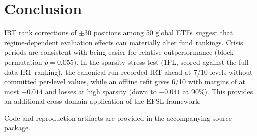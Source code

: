 \documentclass[11pt,a4paper]{article}
\begin{document}
\section{Conclusion}

IRT rank corrections of $\pm$30 positions among 50 global ETFs suggest that regime-dependent evaluation effects can materially alter fund rankings. Crisis periods are consistent with being easier for relative outperformance (block permutation $p = 0.055$). In the sparsity stress test (1PL, scored against the full-data IRT ranking), the canonical run recorded IRT ahead at 7/10 levels without committed per-level values, while an offline refit gives 6/10 with margins of at most $+0.014$ and losses at high sparsity (down to $-0.041$ at 90\%). This provides an additional cross-domain application of the EFSL framework.

Code and reproduction artifacts are provided in the accompanying source package.



\end{document}
